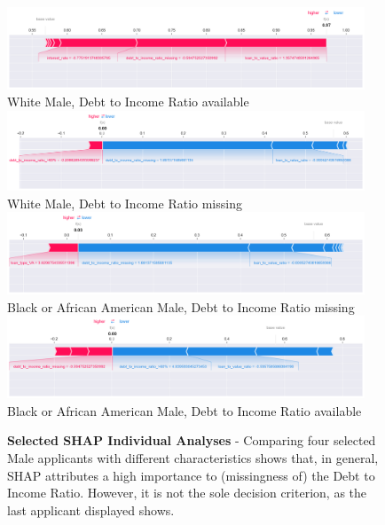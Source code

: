 \begin{figure}[!htbp]
    \centering
    \includegraphics[width=0.95\textwidth]{images/SHAP_Individual_Analyses/SHAP_individual_0.png}
    \small
    White Male, Debt to Income Ratio available
    \includegraphics[width=0.95\textwidth]{images/SHAP_Individual_Analyses/SHAP_individual_1.png}
    \small
    White Male, Debt to Income Ratio missing
    \includegraphics[width=0.95\textwidth]{images/SHAP_Individual_Analyses/SHAP_individual_21.png}
    \small
    Black or African American Male, Debt to Income Ratio missing
    \includegraphics[width=0.95\textwidth]{images/SHAP_Individual_Analyses/SHAP_individual_139.png}
    \small
    Black or African American Male, Debt to Income Ratio available
    \medskip
    \caption[Selected SHAP Individual Analyses]{\textbf{Selected SHAP Individual Analyses} - Comparing four selected Male applicants with different characteristics shows that, in general, SHAP attributes a high importance to (missingness of) the Debt to Income Ratio. However, it is not the sole decision criterion, as the last applicant displayed shows.}
    \label{fig:SHAP_Individual_Analyses}
\end{figure}

